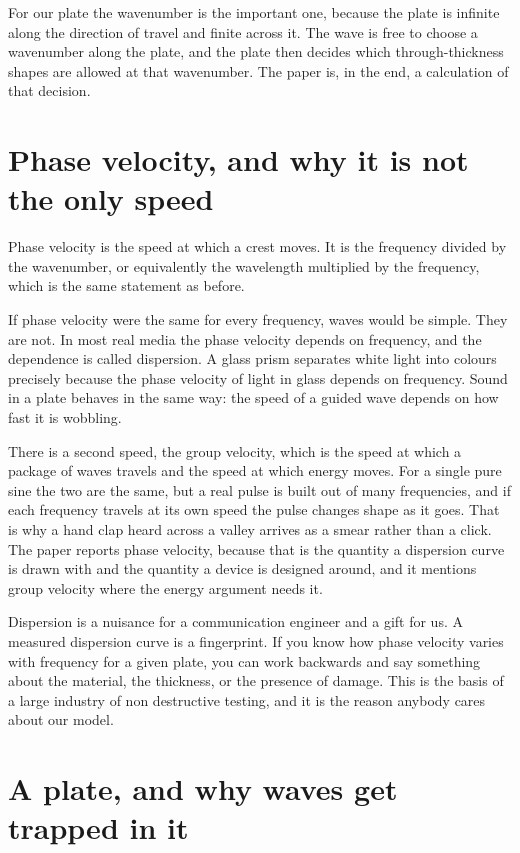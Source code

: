 \documentclass[11pt]{article}
\begin{document}
For our plate the wavenumber is the important one, because the plate is infinite along the direction of
travel and finite across it. The wave is free to choose a wavenumber along the plate, and the plate then
decides which through-thickness shapes are allowed at that wavenumber. The paper is, in the end, a
calculation of that decision.

\section{Phase velocity, and why it is not the only speed}

Phase velocity is the speed at which a crest moves. It is the frequency divided by the wavenumber, or
equivalently the wavelength multiplied by the frequency, which is the same statement as before.

If phase velocity were the same for every frequency, waves would be simple. They are not. In most real
media the phase velocity depends on frequency, and the dependence is called dispersion. A glass prism
separates white light into colours precisely because the phase velocity of light in glass depends on
frequency. Sound in a plate behaves in the same way: the speed of a guided wave depends on how fast it is
wobbling.

There is a second speed, the group velocity, which is the speed at which a package of waves travels and the
speed at which energy moves. For a single pure sine the two are the same, but a real pulse is built out of
many frequencies, and if each frequency travels at its own speed the pulse changes shape as it goes. That is
why a hand clap heard across a valley arrives as a smear rather than a click. The paper reports phase
velocity, because that is the quantity a dispersion curve is drawn with and the quantity a device is designed
around, and it mentions group velocity where the energy argument needs it.

Dispersion is a nuisance for a communication engineer and a gift for us. A measured dispersion curve is a
fingerprint. If you know how phase velocity varies with frequency for a given plate, you can work backwards
and say something about the material, the thickness, or the presence of damage. This is the basis of a large
industry of non destructive testing, and it is the reason anybody cares about our model.

\section{A plate, and why waves get trapped in it}
\end{document}
